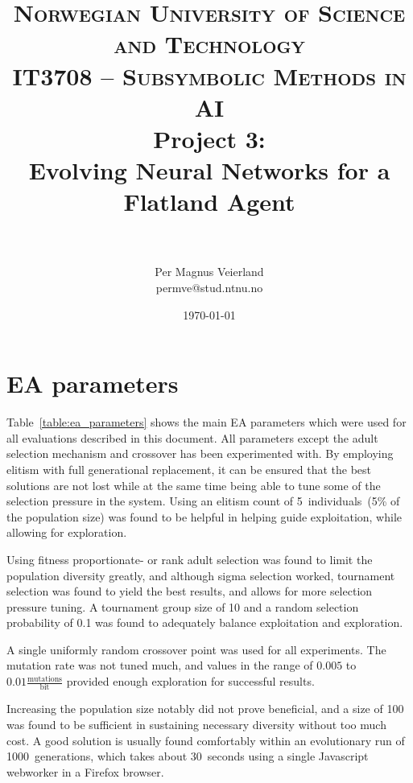 \documentclass[paper=a4, fontsize=11pt]{scrartcl}
\title{
\normalfont \normalsize
\textsc{Norwegian University of Science and Technology\\IT3708 -- Subsymbolic Methods in AI}
\horrule{0.5pt} \\[0.4cm]
\huge Project 3:\\ Evolving Neural Networks for a Flatland Agent\\
\horrule{2pt} \\[0.5cm]
}
\author{Per Magnus Veierland\\permve@stud.ntnu.no}
\date{\normalsize\today}
\begin{document}
\fancyfoot[C]{}
\maketitle

\newpage
{} %
\setcounter{page}{1}

\section{\ac{EA} parameters}

Table~\ref{table:ea_parameters} shows the main \ac{EA} parameters which were used for all evaluations described in this document. All parameters except the adult selection mechanism and crossover has been experimented with. By employing elitism with full generational replacement, it can be ensured that the best solutions are not lost while at the same time being able to tune some of the selection pressure in the system. Using an elitism count of 5~individuals~(5\% of the population size) was found to be helpful in helping guide exploitation, while allowing for exploration.

Using fitness proportionate- or rank adult selection was found to limit the population diversity greatly, and although sigma selection worked, tournament selection was found to yield the best results, and allows for more selection pressure tuning. A tournament group size of 10 and a random selection probability of 0.1 was found to adequately balance exploitation and exploration.

A single uniformly random crossover point was used for all experiments. The mutation rate was not tuned much, and values in the range of $0.005$ to $0.01 \frac{\text{mutations}}{\text{bit}}$ provided enough exploration for successful results.

Increasing the population size notably did not prove beneficial, and a size of 100 was found to be sufficient in sustaining necessary diversity without too much cost. A good solution is usually found comfortably within an evolutionary run of 1000~generations, which takes about 30~seconds using a single Javascript webworker in a Firefox browser.
\end{document}
